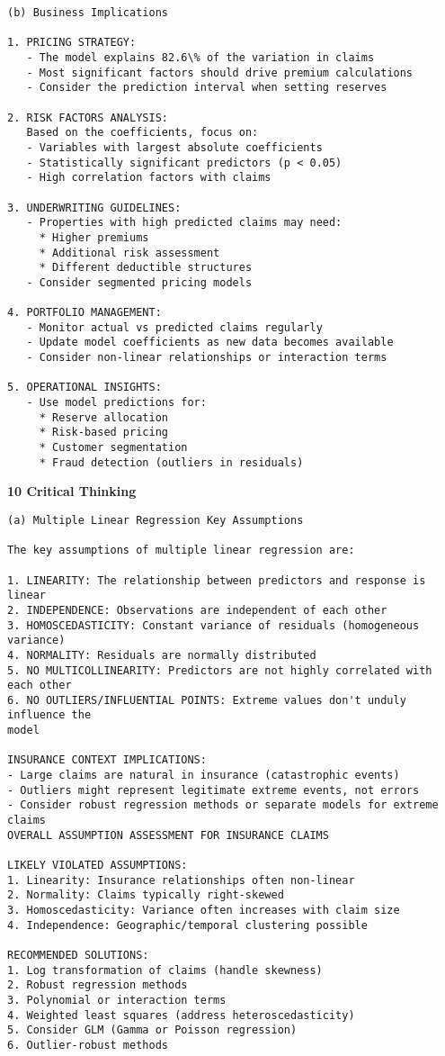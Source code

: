 \documentclass[8pt, twocolumn]{extarticle}
\begin{document}
    \begin{Verbatim}[commandchars=\\\{\}]
(b) Business Implications

1. PRICING STRATEGY:
   - The model explains 82.6\% of the variation in claims
   - Most significant factors should drive premium calculations
   - Consider the prediction interval when setting reserves

2. RISK FACTORS ANALYSIS:
   Based on the coefficients, focus on:
   - Variables with largest absolute coefficients
   - Statistically significant predictors (p < 0.05)
   - High correlation factors with claims

3. UNDERWRITING GUIDELINES:
   - Properties with high predicted claims may need:
     * Higher premiums
     * Additional risk assessment
     * Different deductible structures
   - Consider segmented pricing models

4. PORTFOLIO MANAGEMENT:
   - Monitor actual vs predicted claims regularly
   - Update model coefficients as new data becomes available
   - Consider non-linear relationships or interaction terms

5. OPERATIONAL INSIGHTS:
   - Use model predictions for:
     * Reserve allocation
     * Risk-based pricing
     * Customer segmentation
     * Fraud detection (outliers in residuals)

    \end{Verbatim}
    \textbf{10 Critical Thinking}
    \begin{Verbatim}[commandchars=\\\{\}]
(a) Multiple Linear Regression Key Assumptions

The key assumptions of multiple linear regression are:

1. LINEARITY: The relationship between predictors and response is linear
2. INDEPENDENCE: Observations are independent of each other
3. HOMOSCEDASTICITY: Constant variance of residuals (homogeneous variance)
4. NORMALITY: Residuals are normally distributed
5. NO MULTICOLLINEARITY: Predictors are not highly correlated with each other
6. NO OUTLIERS/INFLUENTIAL POINTS: Extreme values don't unduly influence the
model

INSURANCE CONTEXT IMPLICATIONS:
- Large claims are natural in insurance (catastrophic events)
- Outliers might represent legitimate extreme events, not errors
- Consider robust regression methods or separate models for extreme claims
OVERALL ASSUMPTION ASSESSMENT FOR INSURANCE CLAIMS

LIKELY VIOLATED ASSUMPTIONS:
1. Linearity: Insurance relationships often non-linear
2. Normality: Claims typically right-skewed
3. Homoscedasticity: Variance often increases with claim size
4. Independence: Geographic/temporal clustering possible

RECOMMENDED SOLUTIONS:
1. Log transformation of claims (handle skewness)
2. Robust regression methods
3. Polynomial or interaction terms
4. Weighted least squares (address heteroscedasticity)
5. Consider GLM (Gamma or Poisson regression)
6. Outlier-robust methods

    \end{Verbatim}
\end{document}
